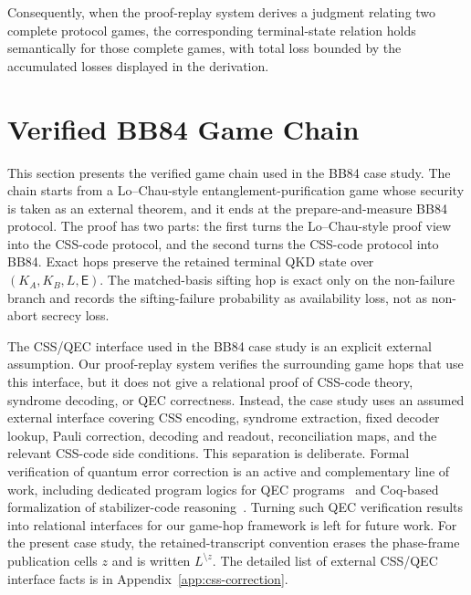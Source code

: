 \documentclass[conference,compsoc]{IEEEtran}
\newcommand{\bb}{\textsf{BB84}\xspace}
\begin{document}
Consequently, when the proof-replay system derives a judgment relating two
complete protocol games, the corresponding terminal-state relation holds
semantically for those complete games, with total loss bounded by the
accumulated losses displayed in the derivation.

\section{Verified BB84 Game Chain}
\label{sec:evaluation}
\begingroup
\setlength{\parskip}{0pt}
\setlength{\abovedisplayskip}{2pt}
\setlength{\belowdisplayskip}{2pt}
\setlength{\abovedisplayshortskip}{1pt}
\setlength{\belowdisplayshortskip}{1pt}

This section presents the verified game chain used in the \bb case study. The
chain starts from a Lo--Chau-style entanglement-purification game whose
security is taken as an external theorem, and it ends at the prepare-and-measure
\bb protocol. The proof has two parts: the first turns the Lo--Chau-style proof
view into the CSS-code protocol, and the second turns the CSS-code protocol
into \bb. Exact hops preserve the retained terminal QKD state over
\((K_A,K_B,L,\mathsf E)\). The matched-basis sifting hop is exact only on the
non-failure branch and records the sifting-failure probability as availability
loss, not as non-abort secrecy loss.

The CSS/QEC interface used in the \bb case study is an explicit external assumption. Our proof-replay system verifies the surrounding game hops that use this interface, but it does not give a relational proof of CSS-code theory, syndrome decoding, or QEC correctness. Instead, the case study uses an assumed external interface covering CSS encoding, syndrome extraction, fixed decoder lookup, Pauli correction, decoding and readout, reconciliation maps, and the relevant CSS-code side conditions. This separation is deliberate. Formal verification of quantum error correction is an active and complementary line of work, including dedicated program logics for QEC programs~\cite{huang2025veriqec} and Coq-based formalization of stabilizer-code reasoning~\cite{feng2025stabilizercoq}. Turning such QEC verification results into relational interfaces for our game-hop framework is left for future work. For the present case study, the retained-transcript convention erases the phase-frame publication cells \(z\) and is written \(L^{\setminus z}\). The detailed list of external CSS/QEC interface facts is in Appendix~\ref{app:css-correction}.
\end{document}
